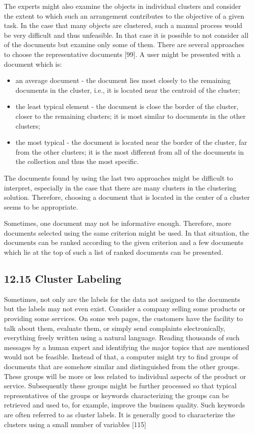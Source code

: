 \documentclass[10pt]{book}
\begin{document}
The experts might also examine the objects in individual clusters and consider the extent to which such an arrangement contributes to the objective of a given task. In the case that many objects are clustered, such a manual process would\\[0pt]
be very difficult and thus unfeasible. In that case it is possible to not consider all of the documents but examine only some of them. There are several approaches to choose the representative documents [99]. A user might be presented with a document which is:

\begin{itemize}
  \item an average document - the document lies most closely to the remaining documents in the cluster, i.e., it is located near the centroid of the cluster;
  \item the least typical element - the document is close the border of the cluster, closer to the remaining clusters; it is most similar to documents in the other clusters;
  \item the most typical - the document is located near the border of the cluster, far from the other clusters; it is the most different from all of the documents in the collection and thus the most specific.
\end{itemize}

The documents found by using the last two approaches might be difficult to interpret, especially in the case that there are many clusters in the clustering solution. Therefore, choosing a document that is located in the center of a cluster seems to be appropriate.

Sometimes, one document may not be informative enough. Therefore, more documents selected using the same criterion might be used. In that situation, the documents can be ranked according to the given criterion and a few documents which lie at the top of such a list of ranked documents can be presented.

\subsection*{12.15 Cluster Labeling}
Sometimes, not only are the labels for the data not assigned to the documents but the labels may not even exist. Consider a company selling some products or providing some services. On some web pages, the customers have the facility to talk about them, evaluate them, or simply send complaints electronically, everything freely written using a natural language. Reading thousands of such messages by a human expert and identifying the major topics that are mentioned would not be feasible. Instead of that, a computer might try to find groups of documents that are somehow similar and distinguished from the other groups. These groups will be more or less related to individual aspects of the product or service. Subsequently these groups might be further processed so that typical representatives of the groups or keywords characterizing the groups can be retrieved and used to, for example, improve the business quality. Such keywords are often referred to as cluster labels. It is generally good to characterize the clusters using a small number of variables [115]
\end{document}
